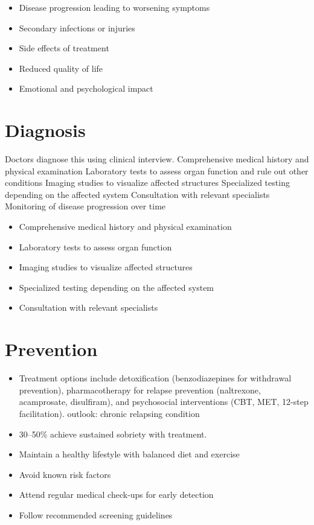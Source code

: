 \begin{itemize}[noitemsep]
  \item Disease progression leading to worsening symptoms
  \item Secondary infections or injuries
  \item Side effects of treatment
  \item Reduced quality of life
  \item Emotional and psychological impact
\end{itemize}
\section{Diagnosis}
Doctors diagnose this using clinical interview. Comprehensive medical history and physical examination Laboratory tests to assess organ function and rule out other conditions Imaging studies to visualize affected structures Specialized testing depending on the affected system Consultation with relevant specialists Monitoring of disease progression over time

\begin{itemize}[noitemsep]
  \item Comprehensive medical history and physical examination
  \item Laboratory tests to assess organ function
  \item Imaging studies to visualize affected structures
  \item Specialized testing depending on the affected system
  \item Consultation with relevant specialists
\end{itemize}
\section{Prevention}
\begin{itemize}[noitemsep]
  \item Treatment options include detoxification (benzodiazepines for withdrawal prevention), pharmacotherapy for relapse prevention (naltrexone, acamprosate, disulfiram), and psychosocial interventions (CBT, MET, 12-step facilitation). outlook: chronic relapsing condition
  \item 30--50\% achieve sustained sobriety with treatment.
  \item Maintain a healthy lifestyle with balanced diet and exercise
  \item Avoid known risk factors
  \item Attend regular medical check-ups for early detection
  \item Follow recommended screening guidelines
\end{itemize}

